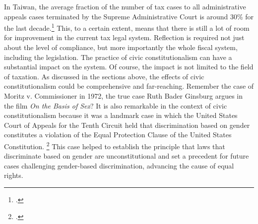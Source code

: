 \documentclass[]{article}
\begin{document}
In Taiwan, the average fraction of the number of tax cases to all administrative appeals cases terminated by the Supreme Administrative Court is around 30\% for the last decade.\footcite{2022b} This, to a certain extent, means that there is still a lot of room for improvement in the current tax legal system. Reflection is required not just about the level of compliance, but more importantly the whole fiscal system, including the legislation. The practice of civic constitutionalism can have a substantial impact on the system. Of course, the impact is not limited to the field of taxation. As discussed in the sections above, the effects of civic constitutionalism could be comprehensive and far-reaching.
Remember the case of Moritz v. Commissioner in 1972, the true case Ruth Bader Ginsburg argues in the film \textit{On the Basis of Sex}? It is also remarkable in the context of civic constitutionalism because it was a landmark case in which the United States Court of Appeals for the Tenth Circuit held that discrimination based on gender constitutes a violation of the Equal Protection Clause of the United States Constitution. \footcite{2023} This case helped to establish the principle that laws that discriminate based on gender are unconstitutional and set a precedent for future cases challenging gender-based discrimination, advancing the cause of equal rights.



\end{document}
